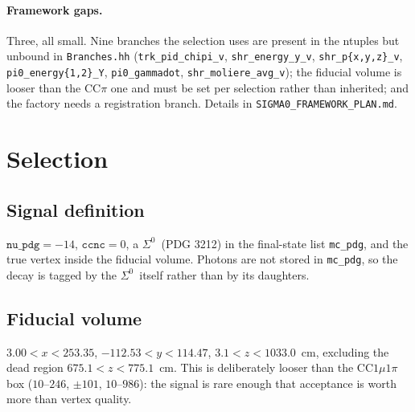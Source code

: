 \documentclass[11pt,a4paper]{article}
\newcommand{\Szero}{\ensuremath{\Sigma^{0}}}
\begin{document}
\paragraph{Framework gaps.} Three, all small. Nine branches the selection uses are
present in the ntuples but unbound in \texttt{Branches.hh}
(\texttt{trk\_pid\_chipi\_v}, \texttt{shr\_energy\_y\_v},
\texttt{shr\_p\{x,y,z\}\_v}, \texttt{pi0\_energy\{1,2\}\_Y},
\texttt{pi0\_gammadot}, \texttt{shr\_moliere\_avg\_v}); the fiducial volume is
looser than the CC$\pi$ one and must be set per selection rather than inherited;
and the factory needs a registration branch. Details in
\texttt{SIGMA0\_FRAMEWORK\_PLAN.md}.

\section{Selection}

\subsection{Signal definition}
$\texttt{nu\_pdg} = -14$, $\texttt{ccnc} = 0$, a \Szero\ (PDG 3212) in the
final-state list \texttt{mc\_pdg}, and the true vertex inside the fiducial volume.
Photons are not stored in \texttt{mc\_pdg}, so the decay is tagged by the \Szero\
itself rather than by its daughters.

\subsection{Fiducial volume}
$3.00 < x < 253.35$, $-112.53 < y < 114.47$, $3.1 < z < 1033.0$~cm, excluding the
dead region $675.1 < z < 775.1$~cm. This is deliberately looser than the
CC$1\mu1\pi$ box ($10$--$246$, $\pm101$, $10$--$986$): the signal is rare enough
that acceptance is worth more than vertex quality.
\end{document}

